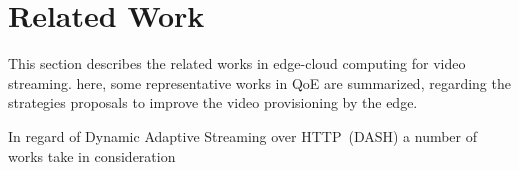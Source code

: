 \section{Related Work}
\label{sec:related-work}

This section describes the related works in edge-cloud computing for video streaming. here, some representative works in QoE are summarized, regarding the strategies proposals to improve the video provisioning by the edge.

In regard of Dynamic Adaptive Streaming over HTTP~(DASH) a number of works take in consideration   